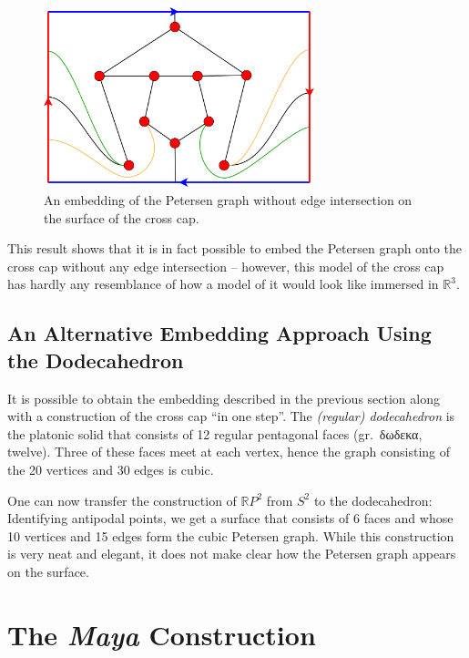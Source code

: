 \documentclass[11pt,            %
               a4paper,         %
               oneside,         %
               DIV12,           %
               fleqn,           %
               halfparskip,     %
               nochapterprefix, %
              ]{scrartcl} %
\theoremstyle{definition}
\begin{document}
\begin{figure}[h]
  \centering
  \includegraphics[keepaspectratio=true,width=0.7\textwidth]{../planar-graphs/crosscap-embedding-5.pdf}
  \caption{An embedding of the Petersen graph without edge
    intersection on the surface of the cross cap.}
  \label{fig:rp2-embedding}
\end{figure}

This result shows that it is in fact possible to embed the Petersen
graph onto the cross cap without any edge intersection -- however,
this model of the cross cap has hardly any resemblance of how a model
of it would look like immersed in $\mathbb{R}^3$.


\subsection{An Alternative Embedding Approach Using the Dodecahedron}

It is possible to obtain the embedding described in the previous
section along with a construction of the cross cap “in one step”. The
\emph{(regular) dodecahedron} is the platonic solid that consists of
12 regular pentagonal faces (gr.~\textgreek{δωδεκα}, twelve). Three of these faces
meet at each vertex, hence the graph consisting of the 20 vertices and
30 edges is cubic.

One can now transfer the construction of $\mathbb{R}P^2$ from $S^2$ to
the dodecahedron: Identifying antipodal points, we get a surface that
consists of 6 faces and whose 10 vertices and 15 edges form the cubic
Petersen graph. While this construction is very neat and elegant, it
does not make clear how the Petersen graph appears on the surface.

\section{The \emph{Maya} Construction}
\end{document}
